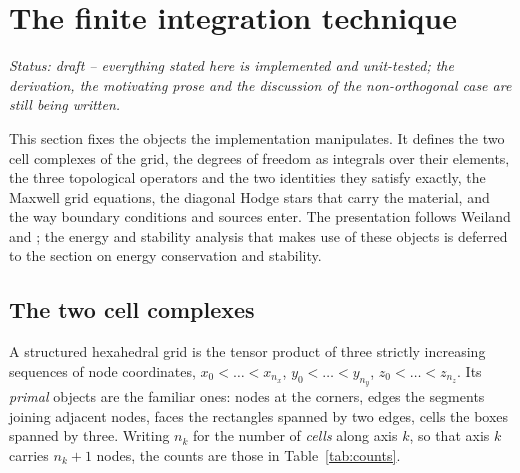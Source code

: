 \section{The finite integration technique}
\label{sec:theory}

\noindent\emph{Status: draft -- everything stated here is implemented and unit-tested; the derivation, the
motivating prose and the discussion of the non-orthogonal case are still being written.}

This section fixes the objects the implementation manipulates. It defines the two cell complexes of the grid, the
degrees of freedom as integrals over their elements, the three topological operators and the two identities they
satisfy exactly, the Maxwell grid equations, the diagonal Hodge stars that carry the material, and the way
boundary conditions and sources enter. The presentation follows Weiland \cite{weiland1977,weiland1996} and
\cite{clemens2001}; the energy and stability analysis that makes use of these objects is deferred to
the section on energy conservation and stability.

\subsection{The two cell complexes}

A structured hexahedral grid is the tensor product of three strictly increasing sequences of node coordinates,
$x_0 < \dots < x_{n_x}$, $y_0 < \dots < y_{n_y}$, $z_0 < \dots < z_{n_z}$. Its \emph{primal} objects are the
familiar ones: nodes at the corners, edges the segments joining adjacent nodes, faces the rectangles spanned by
two edges, cells the boxes spanned by three. Writing $n_k$ for the number of \emph{cells} along axis $k$, so that
axis $k$ carries $n_k+1$ nodes, the counts are those in Table~\ref{tab:counts}.

